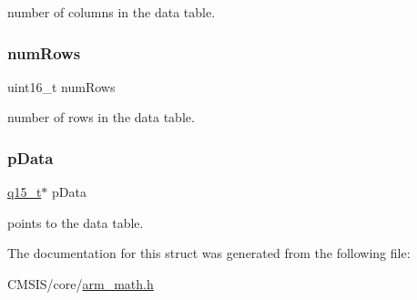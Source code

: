 number of columns in the data table. \mbox{\label{structarm__bilinear__interp__instance__q15_a1bcf80ccdc2acc29198f1592ae300390}} 
\subsubsection{\texorpdfstring{numRows}{numRows}}
{\footnotesize\ttfamily uint16\+\_\+t num\+Rows}

number of rows in the data table. \mbox{\label{structarm__bilinear__interp__instance__q15_a817ede38365e63e561a12069c6c5c087}} 
\subsubsection{\texorpdfstring{pData}{pData}}
{\footnotesize\ttfamily \mbox{\hyperlink{arm__math_8h_ab5a8fb21a5b3b983d5f54f31614052ea}{q15\+\_\+t}}$\ast$ p\+Data}

points to the data table. 

The documentation for this struct was generated from the following file\+:\begin{DoxyCompactItemize}
\item 
C\+M\+S\+I\+S/core/\mbox{\hyperlink{arm__math_8h}{arm\+\_\+math.\+h}}\end{DoxyCompactItemize}
